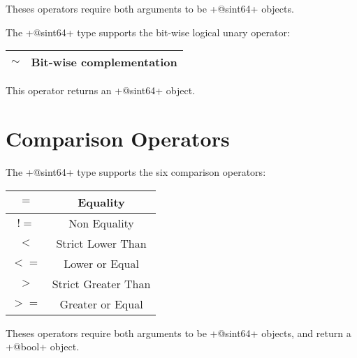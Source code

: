 Theses operators require both arguments to be \ggs+@sint64+ objects.\newline


The \ggs+@sint64+ type supports the bit-wise logical unary operator:\newline

\begin{tabular}{|c|c|}
\hline
$\sim$ & Bit-wise complementation \\
\hline
\end{tabular}

This operator returns an \ggs+@sint64+ object.







\section{Comparison Operators}

The \ggs+@sint64+ type supports the six comparison operators:\newline

\begin{tabular}{|c|c|}
\hline
$=$ & Equality \\
\hline
$!=$ & Non Equality \\
\hline
$<$  & Strict Lower Than \\
\hline
$<=$  & Lower or Equal \\
\hline
$>$  & Strict Greater Than \\
\hline
$>=$  & Greater or Equal \\
\hline
\end{tabular}

Theses operators require both arguments to be \ggs+@sint64+ objects, and return a \ggs+@bool+ object.


